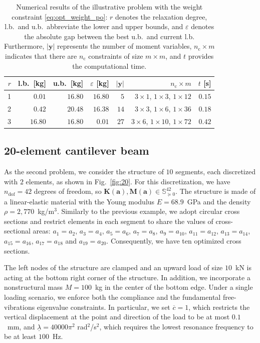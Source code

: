 \documentclass[final,onefignum,onetabnum]{siamart220329}
\begin{document}
\begin{table}[!htbp]
    \centering
    \begin{tabular}{rrrrrrr}
         $r$ & l.b.\ [kg] & u.b.\ [kg] & $\varepsilon$ [kg] & $\lvert \mathbf{y}\rvert$ & $n_\mathrm{c} \times m$  & $t$ [s]\\ \hline
         1 & $0.01$ & $16.80$ & $16.80$ & $5$ & $3\times1$, $1\times3$, $1\times12$ & $0.15$\\
         2 & $0.42$ & $20.48$ & $16.38$ & $14$ & $3\times3$, $1\times6$, $1\times36$ & $0.18$\\
         3 & $16.80$ & $16.80$ & $0.01$ & $27$ & $3\times6$, $1\times10$, $1\times72$ & $0.42$
    \end{tabular}
    \caption{Numerical results of the illustrative problem with the weight constraint \eqref{eq:opt_weight_po}: $r$ denotes the relaxation degree, l.b.\ and u.b.\ abbreviate the lower and upper bounds, and $\varepsilon$ denotes the absolute gap between the best u.b.\ and current l.b. Furthermore, $\lvert\mathbf{y}\rvert$ represents the number of moment variables, $n_\mathrm{c}\times m$ indicates that there are $n_\mathrm{c}$ constraints of size $m\times m$, and $t$ provides the computational time.}
    \label{tab:illustrativew}
\end{table}


\subsection{20-element cantilever beam}\label{sec:ex20}

As the second problem, we consider the structure of $10$ segments, each discretized with $2$ elements, as shown in Fig.~\ref{fig:20}. For this discretization, we have $n_\mathrm{dof}=42$ degrees of freedom, so $\mathbf{K}(\mathbf{a}), \mathbf{M}(\mathbf{a}) \in \mathbb{S}^{42}_{\succeq 0}$. The structure is made of a linear-elastic material with the Young modulus $E=68.9$~GPa and the density $\rho=2,770$~kg/m$^3$. Similarly to the previous example, we adopt circular cross sections and restrict elements in each segment to share the values of cross-sectional areas: $a_1=a_2$, $a_3=a_4$, $a_5=a_6$, $a_7=a_8$, $a_9=a_{10}$, $a_{11}=a_{12}$, $a_{13}=a_{14}$, $a_{15}=a_{16}$, $a_{17}=a_{18}$ and $a_{19}=a_{20}$. Consequently, we have ten optimized cross sections.

The left nodes of the structure are clamped and an upward load of size $10$~kN is acting at the bottom right corner of the structure. In addition, we incorporate a nonstructural mass $M=100$~kg in the center of the bottom edge. Under a single loading scenario, we enforce both the compliance and the fundamental free-vibrations eigenvalue constraints. In particular, we set $\overline{c} = 1$, which restricts the vertical displacement at the point and direction of the load to be at most $0.1$~mm, and $\underline{\lambda}=40000\pi^2$ rad$^2$/s$^2$, which requires the lowest resonance frequency to be at least $100$~Hz. 
\end{document}
